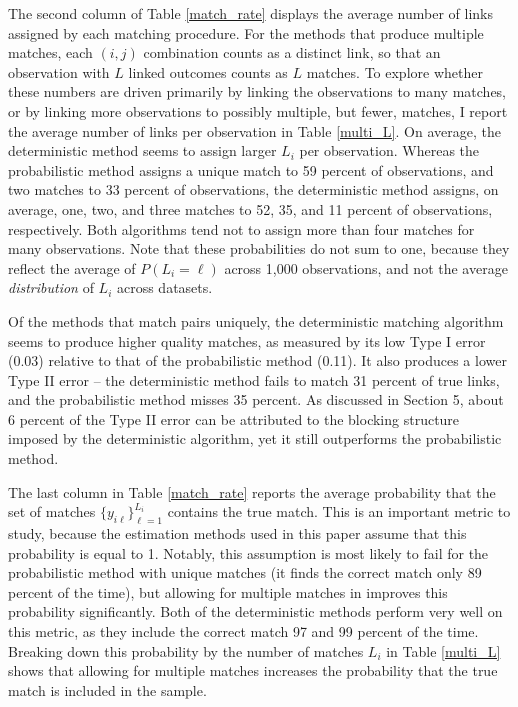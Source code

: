 \documentclass[12pt]{article}
\begin{document}
The second column of Table \ref{match_rate} displays the average number of links assigned by each matching procedure.  For the methods that produce multiple matches, each $(i, j)$ combination counts as a distinct link, so that an observation with $L$ linked outcomes counts as $L$ matches.  To explore whether these numbers are driven primarily by linking the observations to many matches, or by linking more observations to possibly multiple, but fewer, matches, I report the average number of links per observation in Table \ref{multi_L}.  On average, the deterministic method seems to assign larger $L_i$ per observation.  Whereas the probabilistic method assigns a unique match to 59 percent of observations, and two matches to 33 percent of observations, the deterministic method assigns, on average, one, two, and three matches to 52, 35, and 11 percent of observations, respectively.  Both algorithms tend not to assign more than four matches for many observations.  Note that these probabilities do not sum to one, because they reflect the average of $P(L_i = \ell)$ across 1,000 observations, and not the average \textit{distribution} of $L_i$ across datasets. 

Of the methods that match pairs uniquely, the deterministic matching algorithm seems to produce higher quality matches, as measured by its low Type I error (0.03) relative to that of the probabilistic method (0.11).  It also produces a lower Type II error -- the deterministic method fails to match 31 percent of true links, and the probabilistic method misses 35 percent.  As discussed in Section 5, about 6 percent of the Type II error can be attributed to the blocking structure imposed by the deterministic algorithm, yet it still outperforms the probabilistic method.

The last column in Table \ref{match_rate} reports the average probability that the set of matches $\{y_{i\ell}\}_{\ell=1}^{L_i}$ contains the true match.  This is an important metric to study, because the estimation methods used in this paper assume that this probability is equal to 1.  Notably, this assumption is most likely to fail for the probabilistic method with unique matches (it finds the correct match only 89 percent of the time), but allowing for multiple matches in improves this probability significantly.   Both of the deterministic methods perform very well on this metric, as they include the correct match 97 and 99 percent of the time.  Breaking down this probability by the number of matches $L_i$ in Table \ref{multi_L} shows that allowing for multiple matches increases the probability that the true match is included in the sample.  
\end{document}
